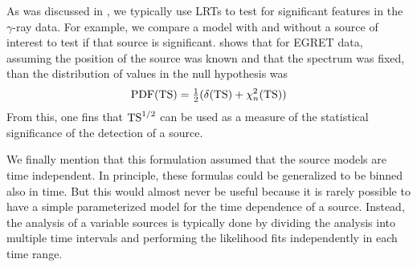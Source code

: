 As was discussed in ,
we typically use \acp{LRT} to test for significant features in
the $\gamma$-ray data.  For example, we compare a model with and
without a source of interest to test if that source is significant.
\cite{mattox_1996a_likelihood-analysis} shows that for \ac{EGRET} data,
assuming the position of the source was known and that the spectrum was
fixed, than the distribution of \ts values in the null hypothesis was
\begin{equation}
  \text{PDF}(\mathrm{TS}) = \tfrac{1}{2} (\delta(\mathrm{TS}) + \chi^2_n(\mathrm{TS}))
\end{equation}
From this, one fins that $\mathrm{TS}^{1/2}$ can be used as a measure of the
statistical significance of the detection of a source.

We finally mention that this formulation assumed that the source models
are time independent.  In principle, these formulas could be generalized
to be binned also in time. But this would almost never be useful because
it is rarely possible to have a simple parameterized model for the time
dependence of a source. Instead, the analysis of a variable sources
is typically done by dividing the analysis into multiple time intervals
and performing the likelihood fits independently in each time range.
